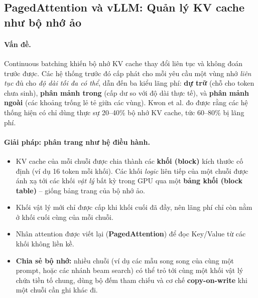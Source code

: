 \subsection{PagedAttention và vLLM: Quản lý KV cache như bộ nhớ ảo}
\label{ssec:pagedattention}

\paragraph{Vấn đề.} Continuous batching khiến bộ nhớ KV cache thay đổi liên tục và không đoán trước được. Các hệ thống trước đó cấp phát cho mỗi yêu cầu một vùng nhớ \emph{liên tục} đủ cho \emph{độ dài tối đa có thể}, dẫn đến ba kiểu lãng phí: \textbf{dự trữ} (chỗ cho token chưa sinh), \textbf{phân mảnh trong} (cấp dư so với độ dài thực tế), và \textbf{phân mảnh ngoài} (các khoảng trống lẻ tẻ giữa các vùng). Kwon et al. \cite{kwon2023vllm} đo được rằng các hệ thống hiện có chỉ dùng thực sự 20--40\% bộ nhớ KV cache, tức 60--80\% bị lãng phí.

\paragraph{Giải pháp: phân trang như hệ điều hành.}
\begin{itemize}
	\item KV cache của mỗi chuỗi được chia thành các \textbf{khối (block)} kích thước cố định (ví dụ 16 token mỗi khối). Các khối \emph{logic} liên tiếp của một chuỗi được ánh xạ tới các khối \emph{vật lý} bất kỳ trong GPU qua một \textbf{bảng khối (block table)} -- giống bảng trang của bộ nhớ ảo.
	\item Khối vật lý mới chỉ được cấp khi khối cuối đã đầy, nên lãng phí chỉ còn nằm ở khối cuối cùng của mỗi chuỗi.
	\item Nhân attention được viết lại (\textbf{PagedAttention}) để đọc Key/Value từ các khối không liền kề.
	\item \textbf{Chia sẻ bộ nhớ:} nhiều chuỗi (ví dụ các mẫu song song của cùng một prompt, hoặc các nhánh beam search) có thể trỏ tới cùng một khối vật lý chứa tiền tố chung, dùng bộ đếm tham chiếu và cơ chế \textbf{copy-on-write} khi một chuỗi cần ghi khác đi.
\end{itemize}

\begin{center}
\label{fig:pagedattention}
\end{center}

